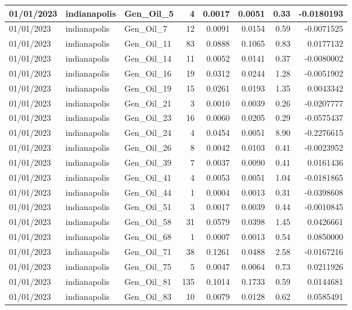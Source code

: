 \documentclass[
  letterpaper,
  DIV=11,
  numbers=noendperiod]{scrartcl}
\begin{document}
\begin{tabular}{l|l|l|r|r|r|r|r}
\hline
01/01/2023 & indianapolis & Gen\_Oil\_5 & 4 & 0.0017 & 0.0051 & 0.33 & -0.0180193\\
\hline
01/01/2023 & indianapolis & Gen\_Oil\_7 & 12 & 0.0091 & 0.0154 & 0.59 & -0.0071525\\
\hline
01/01/2023 & indianapolis & Gen\_Oil\_11 & 83 & 0.0888 & 0.1065 & 0.83 & 0.0177132\\
\hline
01/01/2023 & indianapolis & Gen\_Oil\_14 & 11 & 0.0052 & 0.0141 & 0.37 & -0.0080002\\
\hline
01/01/2023 & indianapolis & Gen\_Oil\_16 & 19 & 0.0312 & 0.0244 & 1.28 & -0.0051902\\
\hline
01/01/2023 & indianapolis & Gen\_Oil\_19 & 15 & 0.0261 & 0.0193 & 1.35 & 0.0043342\\
\hline
01/01/2023 & indianapolis & Gen\_Oil\_21 & 3 & 0.0010 & 0.0039 & 0.26 & -0.0207777\\
\hline
01/01/2023 & indianapolis & Gen\_Oil\_23 & 16 & 0.0060 & 0.0205 & 0.29 & -0.0575437\\
\hline
01/01/2023 & indianapolis & Gen\_Oil\_24 & 4 & 0.0454 & 0.0051 & 8.90 & -0.2276615\\
\hline
01/01/2023 & indianapolis & Gen\_Oil\_26 & 8 & 0.0042 & 0.0103 & 0.41 & -0.0023952\\
\hline
01/01/2023 & indianapolis & Gen\_Oil\_39 & 7 & 0.0037 & 0.0090 & 0.41 & 0.0161436\\
\hline
01/01/2023 & indianapolis & Gen\_Oil\_41 & 4 & 0.0053 & 0.0051 & 1.04 & -0.0181865\\
\hline
01/01/2023 & indianapolis & Gen\_Oil\_44 & 1 & 0.0004 & 0.0013 & 0.31 & -0.0398608\\
\hline
01/01/2023 & indianapolis & Gen\_Oil\_51 & 3 & 0.0017 & 0.0039 & 0.44 & -0.0010845\\
\hline
01/01/2023 & indianapolis & Gen\_Oil\_58 & 31 & 0.0579 & 0.0398 & 1.45 & 0.0426661\\
\hline
01/01/2023 & indianapolis & Gen\_Oil\_68 & 1 & 0.0007 & 0.0013 & 0.54 & 0.0850000\\
\hline
01/01/2023 & indianapolis & Gen\_Oil\_71 & 38 & 0.1261 & 0.0488 & 2.58 & -0.0167216\\
\hline
01/01/2023 & indianapolis & Gen\_Oil\_75 & 5 & 0.0047 & 0.0064 & 0.73 & 0.0211926\\
\hline
01/01/2023 & indianapolis & Gen\_Oil\_81 & 135 & 0.1014 & 0.1733 & 0.59 & 0.0144681\\
\hline
01/01/2023 & indianapolis & Gen\_Oil\_83 & 10 & 0.0079 & 0.0128 & 0.62 & 0.0585491\\

\end{tabular}
\end{document}
